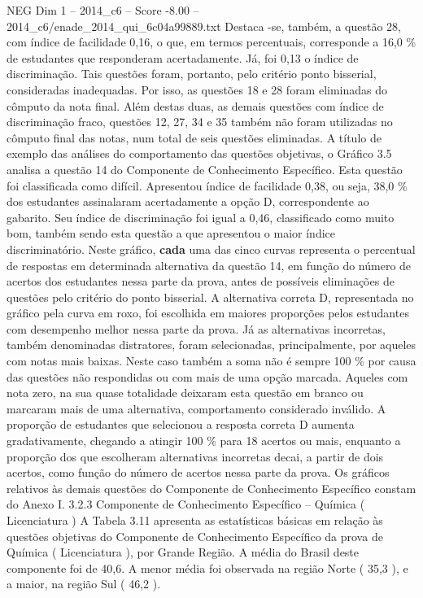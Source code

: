 \begin{textsample}{NEG Dim 1 – 2014\_c6 – Score -8.00 – 2014\_c6/enade\_2014\_qui\_6c04a99889.txt}
Destaca -se, também, a questão 28, com índice de facilidade 0,16, o que, em termos percentuais, corresponde a 16,0 \% de estudantes que responderam acertadamente.
Já, foi 0,13 o índice de discriminação.
Tais questões foram, portanto, pelo critério ponto bisserial, consideradas inadequadas.
Por isso, as questões 18 e 28 foram eliminadas do cômputo da nota final.
Além destas duas, as demais questões com índice de discriminação fraco, questões 12, 27, 34 e 35 também não foram utilizadas no cômputo final das notas, num total de seis questões eliminadas.
A título de exemplo das análises do comportamento das questões objetivas, o Gráfico 3.5 analisa a questão 14 do Componente de Conhecimento Específico.
Esta questão foi classificada como difícil.
Apresentou índice de facilidade 0,38, ou seja, 38,0 \% dos estudantes assinalaram acertadamente a opção D, correspondente ao gabarito.
Seu índice de discriminação foi igual a 0,46, classificado como muito bom, também sendo esta questão a que apresentou o maior índice discriminatório.
Neste gráfico, \textbf{cada} uma das cinco curvas representa o percentual de respostas em determinada alternativa da questão 14, em função do número de acertos dos estudantes nessa parte da prova, antes de possíveis eliminações de questões pelo critério do ponto bisserial.
A alternativa correta D, representada no gráfico pela curva em roxo, foi escolhida em maiores proporções pelos estudantes com desempenho melhor nessa parte da prova.
Já as alternativas incorretas, também denominadas distratores, foram selecionadas, principalmente, por aqueles com notas mais baixas.
Neste caso também a soma não é sempre 100 \% por causa das questões não respondidas ou com mais de uma opção marcada.
Aqueles com nota zero, na sua quase totalidade deixaram esta questão em branco ou marcaram mais de uma alternativa, comportamento considerado inválido.
A proporção de estudantes que selecionou a resposta correta D aumenta gradativamente, chegando a atingir 100 \% para 18 acertos ou mais, enquanto a proporção dos que escolheram alternativas incorretas decai, a partir de dois acertos, como função do número de acertos nessa parte da prova.
Os gráficos relativos às demais questões do Componente de Conhecimento Específico constam do Anexo I. 3.2.3 Componente de Conhecimento Específico – Química ( Licenciatura ) A Tabela 3.11 apresenta as estatísticas básicas em relação às questões objetivas do Componente de Conhecimento Específico da prova de Química ( Licenciatura ), por Grande Região.
A média do Brasil deste componente foi de 40,6.
A menor média foi observada na região Norte ( 35,3 ), e a maior, na região Sul ( 46,2 ).

\end{textsample}
